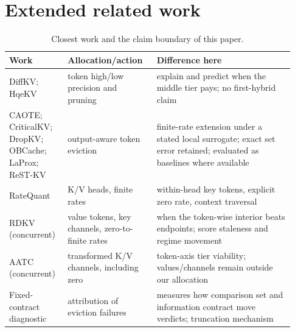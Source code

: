 \section{Extended related work}
\label{app:related}

\begin{table}[h]
\centering
\footnotesize
\setlength{\tabcolsep}{3pt}
\caption{Closest work and the claim boundary of this paper.}
\label{tab:related}
\begin{tabular}{@{}p{0.19\linewidth}p{0.29\linewidth}p{0.45\linewidth}@{}}
\toprule
\textbf{Work} & \textbf{Allocation/action} & \textbf{Difference here} \\
\midrule
DiffKV; HqeKV & token high/low precision and pruning & explain and predict when the middle tier pays; no first-hybrid claim \\
CAOTE; CriticalKV; DropKV; OBCache; LaProx; ReST-KV & output-aware token eviction & finite-rate extension under a stated local surrogate; exact set error retained; evaluated as baselines where available \\
RateQuant & K/V heads, finite rates & within-head key tokens, explicit zero rate, context traversal \\
RDKV (concurrent) & value tokens, key channels, zero-to-finite rates & when the token-wise interior beats endpoints; score staleness and regime movement \\
AATC (concurrent) & transformed K/V channels, including zero & token-axis tier viability; values/channels remain outside our allocation \\
Fixed-contract diagnostic & attribution of eviction failures & measures how comparison set and information contract move verdicts; truncation mechanism \\
\bottomrule
\end{tabular}
\end{table}

